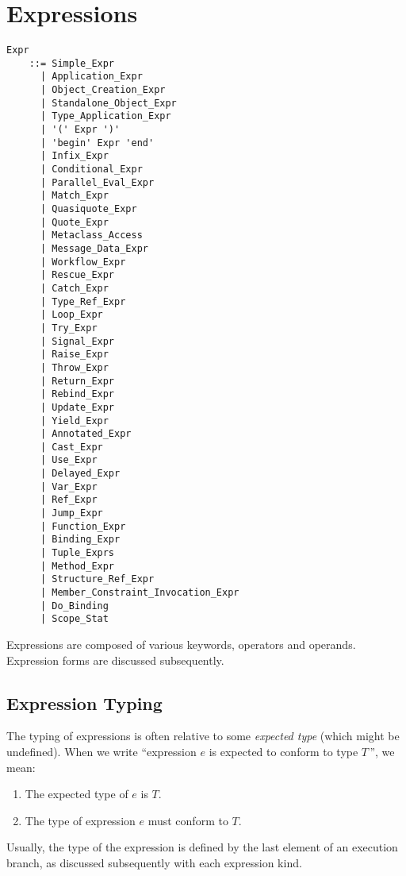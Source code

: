 
\chapter{Expressions}

\minitoc

\newpage

\grammar\begin{lstlisting}
Expr        
    ::= Simple_Expr
      | Application_Expr
      | Object_Creation_Expr
      | Standalone_Object_Expr
      | Type_Application_Expr
      | '(' Expr ')'
      | 'begin' Expr 'end'
      | Infix_Expr
      | Conditional_Expr
      | Parallel_Eval_Expr
      | Match_Expr
      | Quasiquote_Expr
      | Quote_Expr
      | Metaclass_Access
      | Message_Data_Expr
      | Workflow_Expr
      | Rescue_Expr
      | Catch_Expr
      | Type_Ref_Expr
      | Loop_Expr
      | Try_Expr
      | Signal_Expr
      | Raise_Expr
      | Throw_Expr
      | Return_Expr
      | Rebind_Expr
      | Update_Expr
      | Yield_Expr
      | Annotated_Expr
      | Cast_Expr
      | Use_Expr
      | Delayed_Expr
      | Var_Expr
      | Ref_Expr
      | Jump_Expr
      | Function_Expr
      | Binding_Expr
      | Tuple_Exprs
      | Method_Expr
      | Structure_Ref_Expr
      | Member_Constraint_Invocation_Expr
      | Do_Binding
      | Scope_Stat
\end{lstlisting}

Expressions are composed of various keywords, operators and operands. Expression forms are discussed subsequently. 







\section{Expression Typing}
\label{sec:expression-typing}

The typing of expressions is often relative to some {\em expected type} (which might be undefined). When we write ``expression $e$ is expected to conform to type $T$\,'', we mean:
\begin{enumerate}
  \item The expected type of $e$ is $T$.
  \item The type of expression $e$ must conform to $T$. 
\end{enumerate}

Usually, the type of the expression is defined by the last element of an execution branch, as discussed subsequently with each expression kind. 

